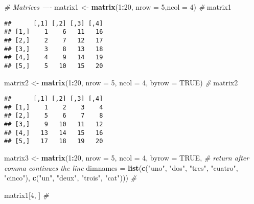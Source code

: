 \documentclass[]{article}
\newenvironment{Shaded}{\begin{snugshade}}{\end{snugshade}}
\newcommand{\CommentTok}[1]{\textcolor[rgb]{0.56,0.35,0.01}{\textit{#1}}}
\newcommand{\DataTypeTok}[1]{\textcolor[rgb]{0.13,0.29,0.53}{#1}}
\newcommand{\DecValTok}[1]{\textcolor[rgb]{0.00,0.00,0.81}{#1}}
\newcommand{\KeywordTok}[1]{\textcolor[rgb]{0.13,0.29,0.53}{\textbf{#1}}}
\newcommand{\NormalTok}[1]{#1}
\newcommand{\OperatorTok}[1]{\textcolor[rgb]{0.81,0.36,0.00}{\textbf{#1}}}
\newcommand{\OtherTok}[1]{\textcolor[rgb]{0.56,0.35,0.01}{#1}}
\newcommand{\StringTok}[1]{\textcolor[rgb]{0.31,0.60,0.02}{#1}}
\begin{document}
\begin{Shaded}
\begin{Highlighting}[]
\CommentTok{# Matrices ----}
\NormalTok{matrix1 <-}\StringTok{ }\KeywordTok{matrix}\NormalTok{(}\DecValTok{1}\OperatorTok{:}\DecValTok{20}\NormalTok{, }\DataTypeTok{nrow =} \DecValTok{5}\NormalTok{,}\DataTypeTok{ncol =} \DecValTok{4}\NormalTok{) }\CommentTok{# }
\NormalTok{matrix1}
\end{Highlighting}
\end{Shaded}

\begin{verbatim}
##      [,1] [,2] [,3] [,4]
## [1,]    1    6   11   16
## [2,]    2    7   12   17
## [3,]    3    8   13   18
## [4,]    4    9   14   19
## [5,]    5   10   15   20
\end{verbatim}

\begin{Shaded}
\begin{Highlighting}[]
\NormalTok{matrix2 <-}\StringTok{ }\KeywordTok{matrix}\NormalTok{(}\DecValTok{1}\OperatorTok{:}\DecValTok{20}\NormalTok{, }\DataTypeTok{nrow =} \DecValTok{5}\NormalTok{, }\DataTypeTok{ncol =} \DecValTok{4}\NormalTok{, }\DataTypeTok{byrow =} \OtherTok{TRUE}\NormalTok{) }\CommentTok{#}
\NormalTok{matrix2}
\end{Highlighting}
\end{Shaded}

\begin{verbatim}
##      [,1] [,2] [,3] [,4]
## [1,]    1    2    3    4
## [2,]    5    6    7    8
## [3,]    9   10   11   12
## [4,]   13   14   15   16
## [5,]   17   18   19   20
\end{verbatim}

\begin{Shaded}
\begin{Highlighting}[]
\NormalTok{matrix3 <-}\StringTok{ }\KeywordTok{matrix}\NormalTok{(}\DecValTok{1}\OperatorTok{:}\DecValTok{20}\NormalTok{, }\DataTypeTok{nrow =} \DecValTok{5}\NormalTok{, }\DataTypeTok{ncol =} \DecValTok{4}\NormalTok{, }\DataTypeTok{byrow =} \OtherTok{TRUE}\NormalTok{, }\CommentTok{# return after comma continues the line}
                  \DataTypeTok{dimnames =} \KeywordTok{list}\NormalTok{(}\KeywordTok{c}\NormalTok{(}\StringTok{"uno"}\NormalTok{, }\StringTok{"dos"}\NormalTok{, }\StringTok{"tres"}\NormalTok{, }\StringTok{"cuatro"}\NormalTok{, }\StringTok{"cinco"}\NormalTok{), }
                                  \KeywordTok{c}\NormalTok{(}\StringTok{"un"}\NormalTok{, }\StringTok{"deux"}\NormalTok{, }\StringTok{"trois"}\NormalTok{, }\StringTok{"cat"}\NormalTok{))) }\CommentTok{#}

\NormalTok{matrix1[}\DecValTok{4}\NormalTok{, ] }\CommentTok{#}
\end{Highlighting}
\end{Shaded}
\end{document}
